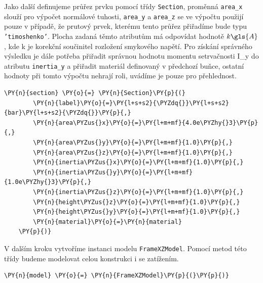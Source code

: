 Jako další definujeme průřez prvku pomocí třídy \texttt{Section}, proměnná \texttt{area\_x} slouží pro výpočet normálové tuhosti, \texttt{area\_y} a \texttt{area\_z} se ve výpočtu použijí pouze v případě, že prutový prvek, kterému tento průřez přiřadíme bude typu \texttt{'timoshenko'}. Plocha zadaná těmto atributům má odpovídat hodnotě $k \gls{A}$, kde k je korekční součinitel rozložení smykového napětí. Pro získání správného výsledku je dále potřeba přiřadit správnou hodnotu momentu setrvačnosti \gls{I_y} do atributu \texttt{inertia\_y} a přiřadit materiál definovaný v předchozí buňce, ostatní hodnoty při tomto výpočtu nehrají roli, uvádíme je pouze pro přehlednost.
\begin{tcolorbox}[breakable, size=fbox, boxrule=1pt, pad at break*=1mm,colback=cellbackground, colframe=cellborder]
    \begin{Verbatim}[commandchars=\\\{\}]
    \PY{n}{section} \PY{o}{=} \PY{n}{Section}\PY{p}{(}
        \PY{n}{label}\PY{o}{=}\PY{l+s+s2}{\PYZdq{}}\PY{l+s+s2}{bar}\PY{l+s+s2}{\PYZdq{}}\PY{p}{,}
        \PY{n}{area\PYZus{}x}\PY{o}{=}\PY{l+m+mf}{4.0e\PYZhy{}3}\PY{p}{,}
        \PY{n}{area\PYZus{}y}\PY{o}{=}\PY{l+m+mf}{1.0}\PY{p}{,}
        \PY{n}{area\PYZus{}z}\PY{o}{=}\PY{l+m+mf}{1.0}\PY{p}{,}
        \PY{n}{inertia\PYZus{}x}\PY{o}{=}\PY{l+m+mf}{1.0}\PY{p}{,}
        \PY{n}{inertia\PYZus{}y}\PY{o}{=}\PY{l+m+mf}{1.0e\PYZhy{}3}\PY{p}{,}
        \PY{n}{inertia\PYZus{}z}\PY{o}{=}\PY{l+m+mf}{1.0}\PY{p}{,}
        \PY{n}{height\PYZus{}z}\PY{o}{=}\PY{l+m+mf}{1.0}\PY{p}{,}
        \PY{n}{height\PYZus{}y}\PY{o}{=}\PY{l+m+mf}{1.0}\PY{p}{,}
        \PY{n}{material}\PY{o}{=}\PY{n}{material}
    \PY{p}{)}
    \end{Verbatim}
\end{tcolorbox}

V dalším kroku vytvoříme instanci modelu \texttt{FrameXZModel}. Pomocí metod této třídy budeme modelovat celou konstrukci i se zatížením.
\begin{tcolorbox}[breakable, size=fbox, boxrule=1pt, pad at break*=1mm,colback=cellbackground, colframe=cellborder]
    \begin{Verbatim}[commandchars=\\\{\}]
    \PY{n}{model} \PY{o}{=} \PY{n}{FrameXZModel}\PY{p}{(}\PY{p}{)}
    \end{Verbatim}
\end{tcolorbox}

